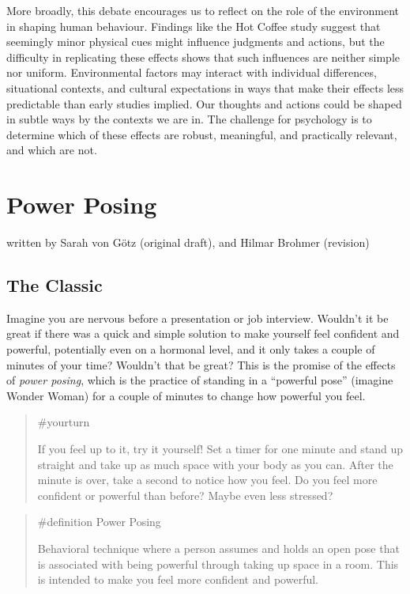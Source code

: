 \documentclass[
  letterpaper,
]{book}
\begin{document}
More broadly, this debate encourages us to reflect on the role of the
environment in shaping human behaviour. Findings like the Hot Coffee
study suggest that seemingly minor physical cues might influence
judgments and actions, but the difficulty in replicating these effects
shows that such influences are neither simple nor uniform. Environmental
factors may interact with individual differences, situational contexts,
and cultural expectations in ways that make their effects less
predictable than early studies implied. Our thoughts and actions could
be shaped in subtle ways by the contexts we are in. The challenge for
psychology is to determine which of these effects are robust,
meaningful, and practically relevant, and which are not.


\chapter{\texorpdfstring{{Power
Posing}}{Power Posing}}\label{power-posing}

{written by Sarah von Götz (original draft), and Hilmar Brohmer
(revision)}

\section{The Classic}\label{the-classic-23}

Imagine you are nervous before a presentation or job interview. Wouldn't
it be great if there was a quick and simple solution to make yourself
feel confident and powerful, potentially even on a hormonal level, and
it only takes a couple of minutes of your time? Wouldn't that be great?
This is the promise of the effects of \emph{power posing}, which is the
practice of standing in a ``powerful pose'' (imagine Wonder Woman) for a
couple of minutes to change how powerful you feel.

\begin{quote}
{\#yourturn}

If you feel up to it, try it yourself! Set a timer for one minute and
stand up straight and take up as much space with your body as you can.
After the minute is over, take a second to notice how you feel. Do you
feel more confident or powerful than before? Maybe even less stressed?
\end{quote}

\begin{quote}
\label{def-powerposing}{\#definition} Power Posing

Behavioral technique where a person assumes and holds an open pose that
is associated with being powerful through taking up space in a room.
This is intended to make you feel more confident and powerful.
\end{quote}
\end{document}
